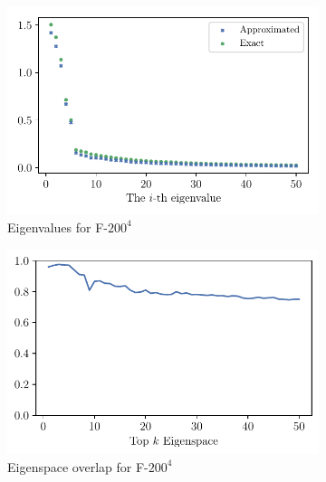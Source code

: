 \begin{figure}[H]
\begin{subfigure}[t]{0.5\textwidth}
        \includegraphics[width=\textwidth]{Appendix_Figures/Full_hessian/newplots/eigenval_fc4_200.pdf}
        \caption{Eigenvalues for F-$200^4$}
    \end{subfigure}%
    \begin{subfigure}[t]{0.5\textwidth}
        \centering
        \captionsetup{justification=centering}
        \includegraphics[width=\textwidth]{Appendix_Figures/Full_hessian/newplots/eigenvec_fc4_200.pdf}
        \caption{Eigenspace overlap for F-$200^4$}
    \end{subfigure}\\
    \begin{subfigure}[t]{0.5\textwidth}
        \centering
        \captionsetup{justification=centering}

\end{subfigure}
\end{figure}
